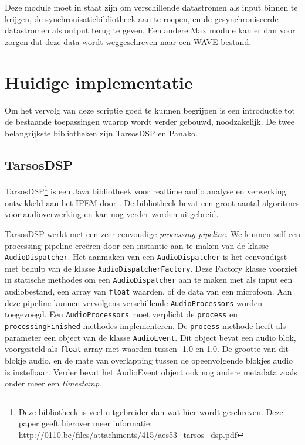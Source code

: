Deze module moet in staat zijn om verschillende datastromen als input binnen te krijgen, de synchronisatiebibliotheek aan te roepen, en de gesynchroniseerde datastromen als output terug te geven. Een andere Max module kan er dan voor zorgen dat deze data wordt weggeschreven naar een WAVE-bestand.

\section{Huidige implementatie}

Om het vervolg van deze scriptie goed te kunnen begrijpen is een introductie tot de bestaande toepassingen waarop wordt verder gebouwd, noodzakelijk. De twee belangrijkste bibliotheken zijn TarsosDSP en Panako. 

\subsection{TarsosDSP}
TarsosDSP\footnote{Deze bibliotheek is veel uitgebreider dan wat hier wordt geschreven. Deze paper geeft hierover meer informatie: \url{http://0110.be/files/attachments/415/aes53_tarsos_dsp.pdf}\cite{six2014tarsosdsp}} is een Java bibliotheek voor realtime audio analyse en verwerking ontwikkeld aan het IPEM door . De bibliotheek bevat een groot aantal algoritmes voor audioverwerking en kan nog verder worden uitgebreid.

TarsosDSP werkt met een zeer eenvoudige \textit{processing pipeline}. We kunnen zelf een processing pipeline creëren door een instantie aan te maken van de klasse \texttt{AudioDispatcher}. Het aanmaken van een \texttt{AudioDispatcher} is het eenvoudigst met behulp van de klasse \texttt{AudioDispatcherFactory}. Deze Factory klasse voorziet in statische methodes om een \texttt{AudioDispatcher} aan te maken met als input een audiobestand, een array van \texttt{float} waarden, of de data van een microfoon. Aan deze pipeline kunnen vervolgens verschillende \texttt{AudioProcessors} worden toegevoegd. Een \texttt{AudioProcessors} moet verplicht de \texttt{process} en \texttt{processingFinished} methodes implementeren. De \texttt{process} methode heeft als parameter een object van de klasse \texttt{AudioEvent}. Dit object bevat een audio blok, voorgesteld als \texttt{float} array met waarden tussen -1.0 en 1.0. De grootte van dit blokje audio, en de mate van overlapping tussen de opeenvolgende blokjes audio is instelbaar. Verder bevat het AudioEvent object ook nog andere metadata zoals onder meer een \textit{timestamp}.

